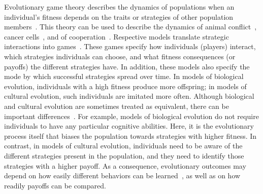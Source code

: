 \documentclass[11pt]{article}
\theoremstyle{plainCl1}
\theoremstyle{plainCl2}
\begin{document}
Evolutionary game theory describes the dynamics of populations when an individual's fitness depends on the traits or strategies of other population members~\citep{hofbauer1998evolutionary, nowak:Nature:2004, hauert2005game,Traulsen:PhilTrans:2022}.  
This theory can be used to describe the dynamics of animal conflict~\citep{maynard-smith:Nature:1973}, cancer cells~\citep{Stein:PTRS:2023}, and of cooperation~\citep{nowak:Science:2006}. 
Respective models translate strategic interactions into games~\citep{smith1982evolution}. 
These games specify how individuals (players) interact, which strategies individuals can choose, and what fitness consequences (or payoffs) the different strategies have. 
In addition, these models also specify the mode by which successful strategies spread over time. 
In models of biological evolution, individuals with a high fitness produce more offspring; in models of cultural evolution, such individuals are imitated more often. 
Although biological and cultural evolution are sometimes treated as equivalent, there can be important differences~\citep{Wu2015,Smolla:PTRS:2021,Denton:TPB:2022}. 
For example, models of biological evolution do not require individuals to have any particular cognitive abilities.
Here, it is the evolutionary process itself that biases the population towards strategies with higher fitness. 
In contrast, in models of cultural evolution, individuals need to be aware of the different strategies present in the population, and they need to identify those strategies with a higher payoff. 
As a consequence, evolutionary outcomes may depend on how easily different behaviors can be learned~\citep{Chatterjee:JTB:2012}, as well as on how readily payoffs can be compared.

\end{document}
